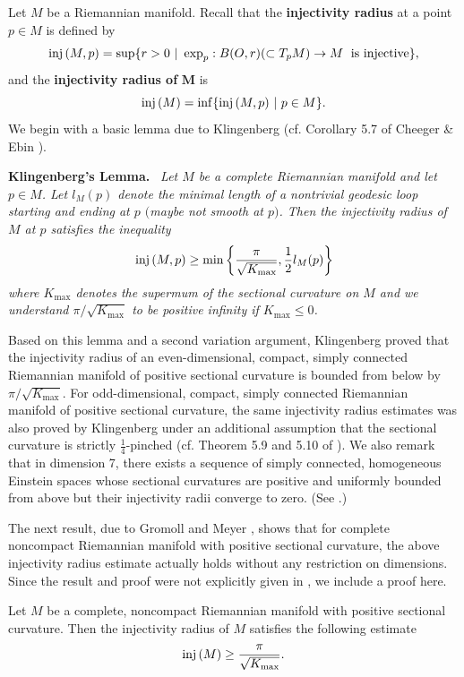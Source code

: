 Let $M$ be a Riemannian manifold. Recall that the {\bf injectivity
radius} at a point $p\in M$ is defined
by
$$
{\rm inj}\,(M,p)=\sup\{r>0\ |\  \exp_p: B(O,r)(\subset T_pM)\to M
\; \text{ is injective}\},
$$
and the {\bf injectivity radius of} ${\mathbf M}$ is
$$
{\rm inj}\,(M)=\inf\{ {\rm inj}\,(M,p)\ |\  p\in M\}.
$$
We begin with a basic lemma due to Klingenberg (cf. Corollary 5.7
of Cheeger \& Ebin \cite{CE}).

\medskip
{\bf Klingenberg's Lemma.} \emph{ \ Let
$M$ be a complete Riemannian manifold and let $p\in M$. Let
$l_M(p)$ denote the minimal length of a nontrivial geodesic loop
starting and ending at $p$ $($maybe not smooth at $p)$. Then the
injectivity radius of $M$ at $p$ satisfies the inequality
$$
{\rm inj}\,(M,p)\geq
\min\left\{\frac{\pi}{\sqrt{K_{\max}}},\frac{1}{2}l_M(p)\right\}
$$
where $K_{\max}$ denotes the supermum of the sectional curvature
on $M$ and we understand ${\pi}/{\sqrt{K_{\max}}}$ to be positive
infinity if $K_{\max}\leq0$.}

\medskip
Based on this lemma and a second variation argument, Klingenberg
proved that the injectivity radius of an even-dimensional,
compact, simply connected Riemannian manifold of positive
sectional curvature is bounded from below by
$\pi/\sqrt{K_{\max}}$. For odd-dimensional, compact, simply
connected Riemannian manifold of positive sectional curvature, the
same injectivity radius estimates was also proved by Klingenberg
under an additional assumption that the sectional curvature is
strictly $\frac{1}{4}$-pinched (cf. Theorem 5.9 and 5.10 of
\cite{CE}). We also remark that in dimension 7, there exists a
sequence of simply connected, homogeneous Einstein spaces whose
sectional curvatures are positive and uniformly bounded from above
but their injectivity radii converge to zero. (See \cite{AW}.)

The next result, due to Gromoll and Meyer \cite{GM}, shows that
for complete noncompact Riemannian manifold with positive
sectional curvature, the above injectivity radius estimate
actually holds without any restriction on dimensions. Since the
result and proof were not explicitly given in \cite{GM}, we
include a proof here.


\begin{theorem}
  \label{thm:cz-gromollmeyer-injectivity-radius-estimate}
 Let $M$
be a complete, noncompact Riemannian manifold with positive
sectional curvature. Then the injectivity radius of $M$ satisfies
the following estimate
$$
{\rm inj}\,(M)\geq\frac{\pi}{\sqrt{K_{\max}}}.
$$
\end{theorem}

